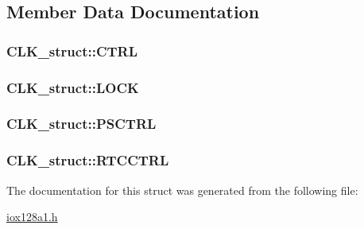 \subsection{Member Data Documentation}
\hypertarget{struct_c_l_k__struct_a1efc0969ed96c40c37d9d5ba95ea76fc}{
\subsubsection[{CTRL}]{ {\bf CLK\_\-struct::CTRL}}}
\label{struct_c_l_k__struct_a1efc0969ed96c40c37d9d5ba95ea76fc}
\hypertarget{struct_c_l_k__struct_a23eed8b6b36e9c64e9c87290a1dec8a9}{
\subsubsection[{LOCK}]{ {\bf CLK\_\-struct::LOCK}}}
\label{struct_c_l_k__struct_a23eed8b6b36e9c64e9c87290a1dec8a9}
\hypertarget{struct_c_l_k__struct_acda90be4a5b71ecd45629e9a77eda3d2}{
\subsubsection[{PSCTRL}]{ {\bf CLK\_\-struct::PSCTRL}}}
\label{struct_c_l_k__struct_acda90be4a5b71ecd45629e9a77eda3d2}
\hypertarget{struct_c_l_k__struct_ae9eb2eed0fea53cd31b84ff2e6ee6808}{
\subsubsection[{RTCCTRL}]{ {\bf CLK\_\-struct::RTCCTRL}}}
\label{struct_c_l_k__struct_ae9eb2eed0fea53cd31b84ff2e6ee6808}


The documentation for this struct was generated from the following file:\begin{DoxyCompactItemize}
\item 
\hyperlink{iox128a1_8h}{iox128a1.h}\end{DoxyCompactItemize}
